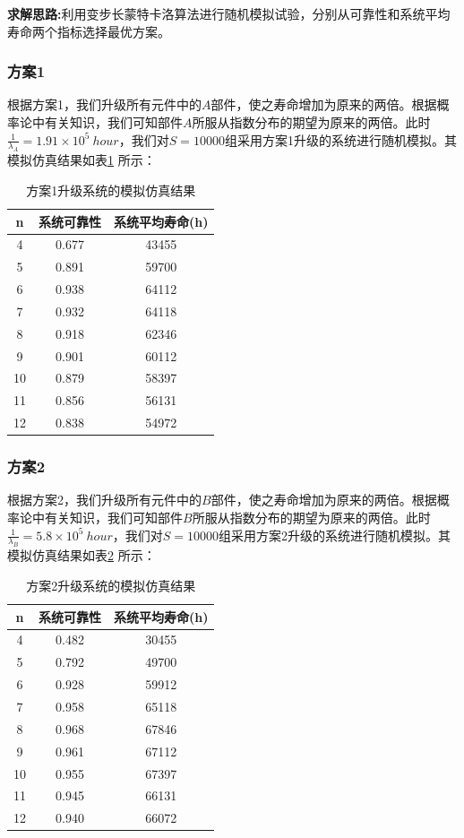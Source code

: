 \documentclass[10.5pt,twocolumn]{jbuaa}
\begin{document}
\textbf{求解思路:}利用变步长蒙特卡洛算法进行随机模拟试验，分别从可靠性和系统平均寿命两个指标选择最优方案。
\subsubsection{方案1}
根据方案1，我们升级所有元件中的$A$部件，使之寿命增加为原来的两倍。根据概率论中有关知识，我们可知部件$A$所服从指数分布的期望为原来的两倍。此时$\frac{1}{\lambda_A} = 1.91 \times 10 ^{5}\ hour$，我们对$S = 10000$组采用方案1升级的系统进行随机模拟。其模拟仿真结果如表\ref{table:3} 所示：
\begin{table}[H]
	\centering
	\label{table:3}
	\caption{方案1升级系统的模拟仿真结果}
	\vspace{0.2cm}
	\begin{tabular}{c|c|c}
	\hline
	n & \kai 系统可靠性 & \kai 系统平均寿命(h) \\
	\hline
	4 & 0.677 & 43455\\
	\hline
	5 & 0.891 & 59700 \\
	\hline
	6 & 0.938 & 64112 \\
	\hline
	7 & 0.932 & 64118 \\
	\hline
	8 & 0.918 & 62346 \\
	\hline
	9 & 0.901 & 60112 \\
	\hline
	10 & 0.879 & 58397 \\
	\hline
	11 & 0.856 & 56131 \\
	\hline
	12 & 0.838 & 54972 \\
	\hline
		
	\end{tabular}
\end{table}
\subsubsection{方案2}
根据方案2，我们升级所有元件中的$B$部件，使之寿命增加为原来的两倍。根据概率论中有关知识，我们可知部件$B$所服从指数分布的期望为原来的两倍。此时$\frac{1}{\lambda_B} = 5.8 \times 10 ^{5}\ hour$，我们对$S = 10000$组采用方案2升级的系统进行随机模拟。其模拟仿真结果如表\ref{table:4} 所示：
\begin{table}[H]
	\centering
	\label{table:4}
	\caption{方案2升级系统的模拟仿真结果}
	\vspace{0.2cm}
	\begin{tabular}{c|c|c}
	\hline
	n & \kai 系统可靠性 & \kai 系统平均寿命(h) \\
	\hline
	4 & 0.482 & 30455\\
	\hline
	5 & 0.792 & 49700 \\
	\hline
	6 & 0.928 & 59912 \\
	\hline
	7 & 0.958 & 65118 \\
	\hline
	8 & 0.968 & 67846 \\
	\hline
	9 & 0.961 & 67112 \\
	\hline
	10 & 0.955 & 67397 \\
	\hline
	11 & 0.945 & 66131 \\
	\hline
	12 & 0.940 & 66072 \\
	\hline
		
	\end{tabular}
\end{table}
\end{document}
